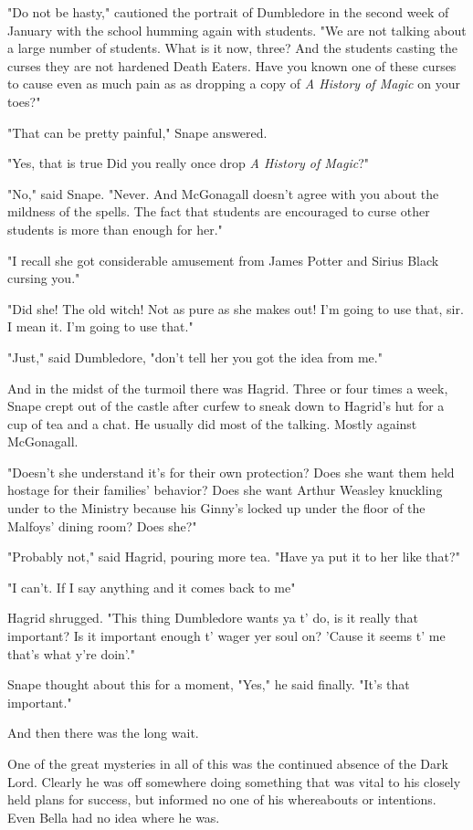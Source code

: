 "Do not be hasty," cautioned the portrait of Dumbledore in the second week of January with the school humming again with students. "We are not talking about a large number of students. What is it now, three? And the students casting the curses{\el} they are not hardened Death Eaters. Have you known one of these curses to cause even as much pain as{\el} as dropping a copy of \emph{A History of Magic} on your toes?"

"That can be pretty painful," Snape answered.

"Yes, that is true{\el} Did you really once drop \emph{A History of Magic}{\el}?"

"No," said Snape. "Never. And McGonagall doesn't agree with you about the mildness of the spells. The fact that students are encouraged to curse other students is more than enough for her."

"I recall she got considerable amusement from James Potter and Sirius Black cursing you."

"Did she! The old witch! Not as pure as she makes out! I'm going to use that, sir. I mean it. I'm going to use that."

"Just," said Dumbledore, "don't tell her you got the idea from me."

And in the midst of the turmoil there was Hagrid. Three or four times a week, Snape crept out of the castle after curfew to sneak down to Hagrid's hut for a cup of tea and a chat. He usually did most of the talking. Mostly against McGonagall.

"Doesn't she understand it's for their own protection? Does she want them held hostage for their families' behavior? Does she want Arthur Weasley knuckling under to the Ministry because his Ginny's locked up under the floor of the Malfoys' dining room? Does she?"

"Probably not," said Hagrid, pouring more tea. "Have ya put it to her like that?"

"I can't. If I say anything and it comes back to me{\el}"

Hagrid shrugged. "This thing Dumbledore wants ya t' do, is it really that important? Is it important enough t' wager yer soul on? 'Cause it seems t' me that's what y're doin'."

Snape thought about this for a moment, "Yes," he said finally. "It's that important."

And then there was the long wait.

One of the great mysteries in all of this was the continued absence of the Dark Lord. Clearly he was off somewhere doing something that was vital to his closely held plans for success, but informed no one of his whereabouts or intentions. Even Bella had no idea where he was.

